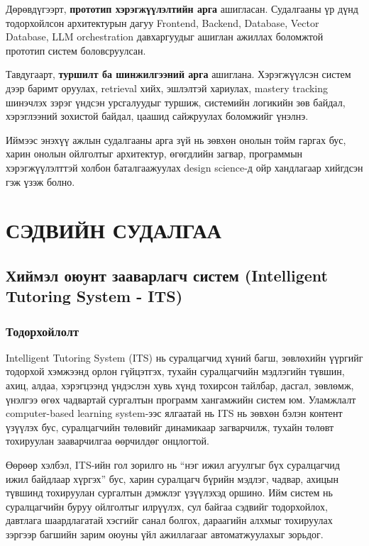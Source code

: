 \documentclass[12pt,A4]{report}
\newcommand{\eng}[1]{#1}
\begin{document}
Дөрөвдүгээрт, \textbf{прототип хэрэгжүүлэлтийн арга} ашигласан. Судалгааны үр дүнд тодорхойлсон архитектурын дагуу \eng{Frontend}, \eng{Backend}, \eng{Database}, \eng{Vector Database}, \eng{LLM orchestration} давхаргуудыг ашиглан ажиллах боломжтой прототип систем боловсруулсан.

Тавдугаарт, \textbf{туршилт ба шинжилгээний арга} ашиглана. Хэрэгжүүлсэн систем дээр баримт оруулах, retrieval хийх, эшлэлтэй хариулах, \eng{mastery tracking} шинэчлэх зэрэг үндсэн урсгалуудыг туршиж, системийн логикийн зөв байдал, хэрэглээний зохистой байдал, цаашид сайжруулах боломжийг үнэлнэ.

Иймээс энэхүү ажлын судалгааны арга зүй нь зөвхөн онолын тойм гаргах бус, харин онолын ойлголтыг архитектур, өгөгдлийн загвар, программын хэрэгжүүлэлттэй холбон баталгаажуулах \eng{design science}-д ойр хандлагаар хийгдсэн гэж үзэж болно.



\chapter{СЭДВИЙН СУДАЛГАА}

\section{Хиймэл оюунт зааварлагч систем (\eng{Intelligent Tutoring System - ITS})}

\subsection{Тодорхойлолт}

\eng{Intelligent Tutoring System (ITS)} нь суралцагчид хүний багш, зөвлөхийн үүргийг тодорхой хэмжээнд орлон гүйцэтгэх, тухайн суралцагчийн мэдлэгийн түвшин, ахиц, алдаа, хэрэгцээнд үндэслэн хувь хүнд тохирсон тайлбар, дасгал, зөвлөмж, үнэлгээ өгөх чадвартай сургалтын программ хангамжийн систем юм. Уламжлалт \eng{computer-based learning system}-ээс ялгаатай нь \eng{ITS} нь зөвхөн бэлэн контент үзүүлэх бус, суралцагчийн төлөвийг динамикаар загварчилж, тухайн төлөвт тохируулан зааварчилгаа өөрчилдөг онцлогтой.

Өөрөөр хэлбэл, \eng{ITS}-ийн гол зорилго нь ``нэг ижил агуулгыг бүх суралцагчид ижил байдлаар хүргэх'' бус, харин суралцагч бүрийн мэдлэг, чадвар, ахицын түвшинд тохируулан сургалтын дэмжлэг үзүүлэхэд оршино. Ийм систем нь суралцагчийн буруу ойлголтыг илрүүлэх, сул байгаа сэдвийг тодорхойлох, давтлага шаардлагатай хэсгийг санал болгох, дараагийн алхмыг тохируулах зэргээр багшийн зарим оюуны үйл ажиллагааг автоматжуулахыг зорьдог.
\end{document}
